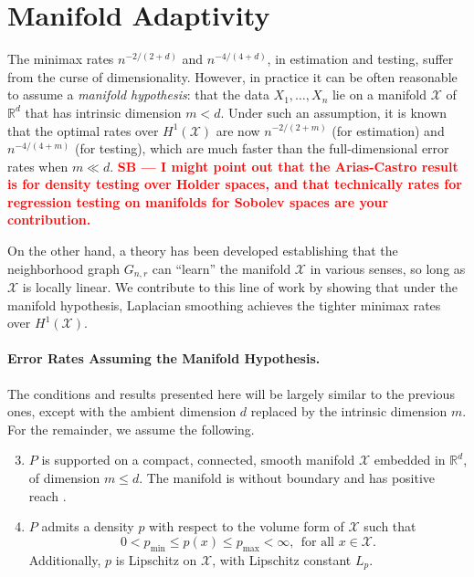 \documentclass[twoside]{article}
\newcommand{\red}[1]{\textcolor{red}{#1}}
\newcommand{\sbcomment}[1]{{\bf{{\red{{SB --- #1}}}}}}
\newcommand{\Reals}{\mathbb{R}}
\newcommand{\1}{\mathbf{1}}
\newcommand{\Rd}{\Reals^d}
\newcommand{\Xset}{\mathcal{X}}
\theoremstyle{definition}
\theoremstyle{remark}
\begin{document}
\section{Manifold Adaptivity}
\label{sec:manifold_adaptivity}

The minimax rates $n^{-2/(2 + d)}$ and $n^{-4/(4 + d)}$, in estimation and testing, suffer from the curse of dimensionality. However, in practice it can be often reasonable to assume a \emph{manifold hypothesis}: that the data $X_1,\ldots,X_n$ lie on a manifold $\Xset$ of $\Rd$ that has intrinsic dimension $m < d$. Under such an assumption, it is known \citep{bickel2007,ariascastro2018} that the optimal rates over $H^1(\Xset)$ are now $n^{-2/(2 + m)}$ (for estimation) and $n^{-4/(4 + m)}$ (for testing), which are much faster than the full-dimensional error rates when $m \ll d$. \sbcomment{I might point out that the Arias-Castro result is for density testing over Holder spaces, and that technically rates for regression testing on manifolds for Sobolev spaces are your contribution.}


On the other hand, a theory has been developed \citep{niyogi2008finding,belkin03,belkin05,niyogi2013,balakrishnan2012minimax,balakrishnan2013cluster} establishing that the neighborhood graph $G_{n,r}$ can ``learn'' the manifold $\Xset$ in various senses, so long as $\Xset$ is locally linear. We contribute to this line of work by showing that under the manifold hypothesis, Laplacian smoothing achieves the tighter minimax rates over $H^1(\Xset)$.

\paragraph{Error Rates Assuming the Manifold Hypothesis.}

The conditions and results presented here will be largely similar to the previous ones, except with the ambient dimension $d$ replaced by the intrinsic dimension $m$. For the remainder, we assume the following.
\begin{enumerate}[label=(P\arabic*)]
	\setcounter{enumi}{2}
	\item 
	\label{asmp:domain_manifold}
	$P$ is supported on a compact, connected, smooth manifold $\Xset$ embedded in $\Rd$, of dimension $m \leq d$. The manifold is without boundary and has positive reach \citep{federer1959}.
	\item 
	\label{asmp:density_manifold} 
	$P$ admits a density $p$ with respect to the volume form of $\Xset$ such that 
	\begin{equation*}
	0 < p_{\min} \leq p(x) \leq p_{\max} < \infty, ~~\textrm{for all $x \in \Xset$}. 
	\end{equation*}
	Additionally, $p$ is Lipschitz on $\Xset$, with Lipschitz constant $L_p$.
\end{enumerate}
\end{document}

